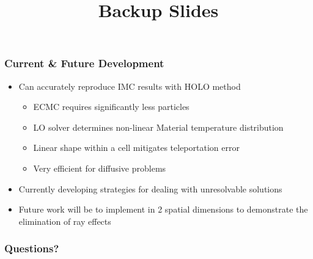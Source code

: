 \documentclass[xcolor=dvipsnames,hyperref={pdfpagelabels=false},handout,unknownkeysallowed]{beamer}
\newcommand{\coly}[1]{{\color{yellow} #1}}
\newlength{\wideitemsep}
\let\olditem\item
\renewcommand{\item}{\setlength{\itemsep}{\wideitemsep}\olditem}
\begin{document}
\begin{frame}
    \frametitle{Current \& Future Development}
    \begin{itemize}
        \item Can accurately reproduce IMC results with HOLO method
        \begin{itemize}
            \item ECMC requires significantly less particles
            \item LO solver determines non-linear Material temperature distribution
            \item Linear shape within a cell mitigates teleportation error
            \item Very efficient for diffusive problems
        \end{itemize}
    \item Currently developing strategies for dealing with unresolvable solutions
    \item Future work will be to implement in 2 spatial dimensions to demonstrate the
        elimination of ray effects
    \end{itemize}
\end{frame}

\date{}
\begin{frame}
    \frametitle{{\LARGE\coly{Questions?}}}
    \vspace{-0.21in}
    \titlepage \vspace{-0.2113in}
\end{frame}

\appendix
{}
\setcounter{finalframe}{\value{framenumber}}

\title{Backup Slides}
\author{}
\date{}

\begin{frame}
    \titlepage
\end{frame}
\end{document}
